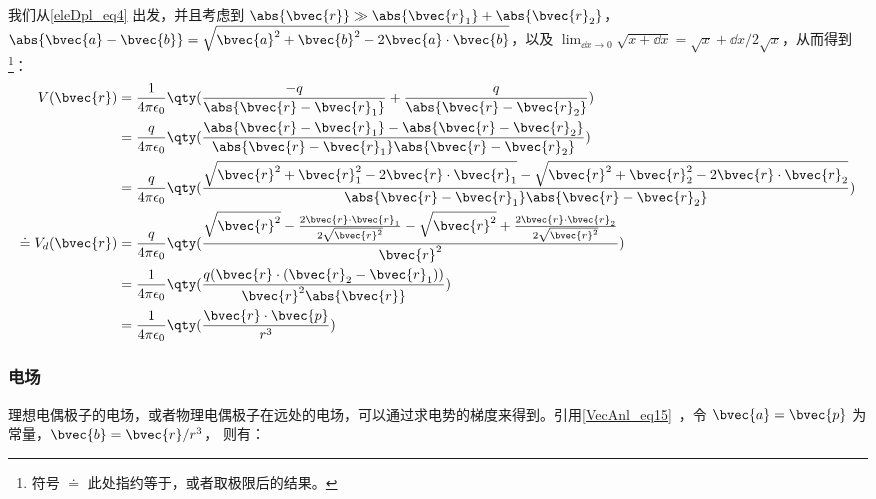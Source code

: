 我们从\autoref{eleDpl_eq4} 出发，并且考虑到 $\abs{\bvec{r}}\gg\\\abs{\bvec{r}_1}+\abs{\bvec{r}_2}$，$\abs{\bvec{a}-\bvec{b}}=\sqrt{\bvec{a}^2+\bvec{b}^2-2\bvec{a}\cdot\bvec{b}}$，以及 $\lim_{\dd x\rightarrow 0}\sqrt{x+\dd x}=\sqrt{x}+\dd x/2\sqrt{x}$，从而得到\footnote{符号 $\doteq$ 此处指约等于，或者取极限后的结果。}：
\begin{equation}
\begin{aligned}
V(\bvec{r})&=\frac{1}{4\pi\epsilon_0}\qty(\frac{-q}{\abs{\bvec{r}-\bvec{r}_1}}+\frac{q}{\abs{\bvec{r}-\bvec{r}_2}})\\
&=\frac{q}{4\pi\epsilon_0}\qty(\frac{\abs{\bvec{r}-\bvec{r}_1}-\abs{\bvec{r}-\bvec{r}_2}}{\abs{\bvec{r}-\bvec{r}_1}\abs{\bvec{r}-\bvec{r}_2}})\\
&=\frac{q}{4\pi\epsilon_0}\qty(\frac{\sqrt{\bvec{r}^2+\bvec{r}_1^2-2\bvec{r}\cdot\bvec{r}_1}-\sqrt{\bvec{r}^2+\bvec{r}_2^2-2\bvec{r}\cdot\bvec{r}_2}}{\abs{\bvec{r}-\bvec{r}_1}\abs{\bvec{r}-\bvec{r}_2}})\\
\doteq V_d(\bvec{r})&=\frac{q}{4\pi\epsilon_0}\qty(\frac{\sqrt{\bvec{r}^2}-\frac{2\bvec{r}\cdot\bvec{r}_1}{2\sqrt{\bvec{r}^2}}-\sqrt{\bvec{r}^2}+\frac{2\bvec{r}\cdot\bvec{r}_2}{2\sqrt{\bvec{r}^2}}}{\bvec{r}^2})\\
&=\frac{1}{4\pi\epsilon_0}\qty(\frac{q(\bvec{r}\cdot(\bvec{r}_2-\bvec{r}_1))}{\bvec{r}^2\abs{\bvec{r}}})\\
&=\frac{1}{4\pi\epsilon_0}\qty(\frac{\bvec{r}\cdot\bvec{p}}{r^3})
\end{aligned}
\end{equation}



\subsubsection{电场}

理想电偶极子的电场，或者物理电偶极子在远处的电场，可以通过求电势的梯度来得到。引用\autoref{VecAnl_eq15}~，令 $\bvec{a}=\bvec{p}$ 为常量，$\bvec{b}=\bvec{r}/r^3$， 则有：

